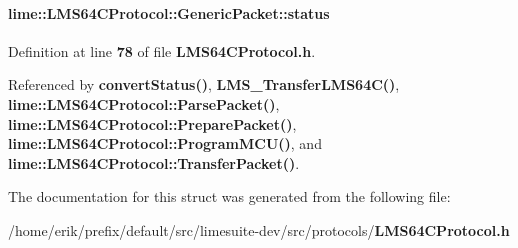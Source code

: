 \paragraph[{status}]{ lime\+::\+L\+M\+S64\+C\+Protocol\+::\+Generic\+Packet\+::status}\label{structlime_1_1LMS64CProtocol_1_1GenericPacket_adb2dc2cb054e479871d07c8ca7ec6283}


Definition at line {\bf 78} of file {\bf L\+M\+S64\+C\+Protocol.\+h}.



Referenced by {\bf convert\+Status()}, {\bf L\+M\+S\+\_\+\+Transfer\+L\+M\+S64\+C()}, {\bf lime\+::\+L\+M\+S64\+C\+Protocol\+::\+Parse\+Packet()}, {\bf lime\+::\+L\+M\+S64\+C\+Protocol\+::\+Prepare\+Packet()}, {\bf lime\+::\+L\+M\+S64\+C\+Protocol\+::\+Program\+M\+C\+U()}, and {\bf lime\+::\+L\+M\+S64\+C\+Protocol\+::\+Transfer\+Packet()}.



The documentation for this struct was generated from the following file\+:\begin{DoxyCompactItemize}
\item 
/home/erik/prefix/default/src/limesuite-\/dev/src/protocols/{\bf L\+M\+S64\+C\+Protocol.\+h}\end{DoxyCompactItemize}

